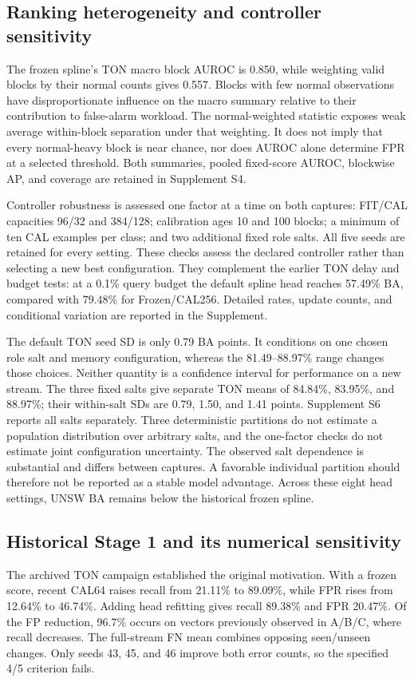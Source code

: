 \subsection{Ranking heterogeneity and controller sensitivity}
The frozen spline's TON macro block AUROC is 0.850, while weighting valid blocks by their normal counts gives 0.557. Blocks with few normal observations have disproportionate influence on the macro summary relative to their contribution to false-alarm workload. The normal-weighted statistic exposes weak average within-block separation under that weighting. It does not imply that every normal-heavy block is near chance, nor does AUROC alone determine FPR at a selected threshold. Both summaries, pooled fixed-score AUROC, blockwise AP, and coverage are retained in Supplement S4.

Controller robustness is assessed one factor at a time on both captures: FIT/CAL capacities 96/32 and 384/128; calibration ages 10 and 100 blocks; a minimum of ten CAL examples per class; and two additional fixed role salts. All five seeds are retained for every setting. These checks assess the declared controller rather than selecting a new best configuration. They complement the earlier TON delay and budget tests: at a 0.1\% query budget the default spline head reaches 57.49\% BA, compared with 79.48\% for Frozen/CAL256. Detailed rates, update counts, and conditional variation are reported in the Supplement.


The default TON seed SD is only 0.79 BA points. It conditions on one chosen role salt and memory configuration, whereas the 81.49--88.97\% range changes those choices. Neither quantity is a confidence interval for performance on a new stream. The three fixed salts give separate TON means of 84.84\%, 83.95\%, and 88.97\%; their within-salt SDs are 0.79, 1.50, and 1.41 points. Supplement S6 reports all salts separately. Three deterministic partitions do not estimate a population distribution over arbitrary salts, and the one-factor checks do not estimate joint configuration uncertainty. The observed salt dependence is substantial and differs between captures. A favorable individual partition should therefore not be reported as a stable model advantage. Across these eight head settings, UNSW BA remains below the historical frozen spline.

\subsection{Historical Stage 1 and its numerical sensitivity}
The archived TON campaign established the original motivation. With a frozen score, recent CAL64 raises recall from 21.11\% to 89.09\%, while FPR rises from 12.64\% to 46.74\%. Adding head refitting gives recall 89.38\% and FPR 20.47\%. Of the FP reduction, 96.7\% occurs on vectors previously observed in A/B/C, where recall decreases. The full-stream FN mean combines opposing seen/unseen changes. Only seeds 43, 45, and 46 improve both error counts, so the specified 4/5 criterion fails.

